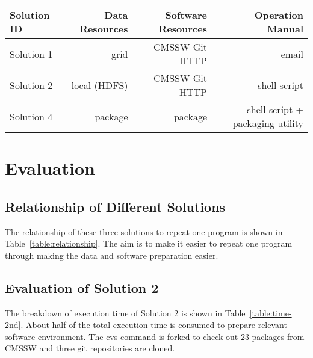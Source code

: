 \documentclass{acm_proc_article-sp}
\begin{document}
\begin{table*}
    \centering
    \begin{tabular}{|l|r|r|r|}
        \hline
        Solution ID & Data Resources & Software Resources & Operation Manual \\ \hline
        Solution 1& grid & CMSSW Git HTTP & email \\ \hline
        Solution 2& local (HDFS) & CMSSW Git HTTP & shell script \\ \hline
        Solution 4& package & package & shell script + packaging utility \\ \hline
    \end{tabular}
    \caption{The relationship of different solutions}
    \label{table:relationship}
\end{table*}



\section{Evaluation}
\subsection{Relationship of Different Solutions}
The relationship of these three solutions to repeat one program is shown in Table~\ref{table:relationship}. The aim is to make it easier to repeat one program through making the data and software preparation easier.

\subsection{Evaluation of Solution 2}
The breakdown of execution time of Solution 2 is shown in Table~\ref{table:time-2nd}. About half of the total execution time is consumed to prepare relevant software environment. The cvs command is forked to check out 23 packages from CMSSW and three git repositories are cloned.
\end{document}
